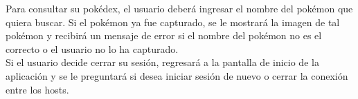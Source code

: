 \documentclass[12pt]{article}
\begin{document}
Para consultar su pokédex, el usuario deberá ingresar el nombre del pokémon que quiera buscar. Si el pokémon ya fue capturado, se le mostrará la imagen de tal pokémon y recibirá un mensaje de error si el nombre del pokémon no es el correcto o el usuario no lo ha capturado. \\

Si el usuario decide cerrar su sesión, regresará a la pantalla de inicio de la aplicación y se le preguntará si desea iniciar sesión de nuevo o cerrar la conexión entre los hosts. \\

\end{document}
